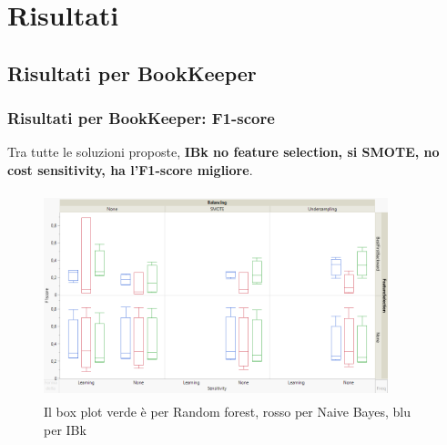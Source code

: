 \documentclass{beamer}
\begin{document}
\section{Risultati}
\subsection{Risultati per BookKeeper}
\begin{frame}
	\frametitle{Risultati per BookKeeper: F1-score}
	
	\fontsize{7pt}{8pt}\selectfont
	
	Tra tutte le soluzioni proposte, \textbf{IBk no
	feature selection, si SMOTE, no cost sensitivity, ha l'F1-score migliore}.
	
	\centering
	\begin{figure}
	\includegraphics[width=10cm, height=6cm]{bookkeeper-f1score}
	\caption{Il box plot verde è per Random forest, rosso per Naive Bayes, blu per IBk}
	\end{figure}
\end{frame}
\end{document}
